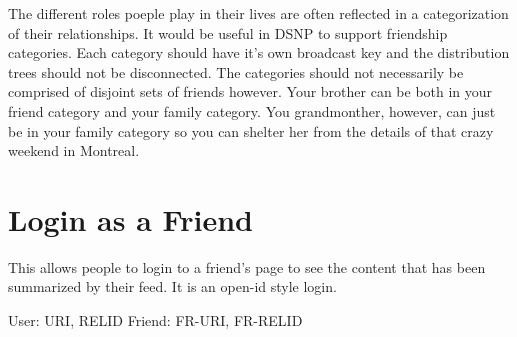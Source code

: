 \documentclass[letterpaper,11pt,oneside]{article}
\begin{document}
The different roles poeple play in their lives are often reflected in a
categorization of their relationships. It would be useful in DSNP to support
friendship categories. Each category should have it's own broadcast key and the
distribution trees should not be disconnected. The categories should not
necessarily be comprised of disjoint sets of friends however. Your brother can
be both in your friend category and your family category. You grandmonther,
however, can just be in your family category so you can shelter her from the
details of that crazy weekend in Montreal.

\section{Login as a Friend}

This allows people to login to a friend's page to see the content that has been
summarized by their feed. It is an open-id style login.

User:     URI,    RELID
Friend:   FR-URI, FR-RELID
\end{document}
